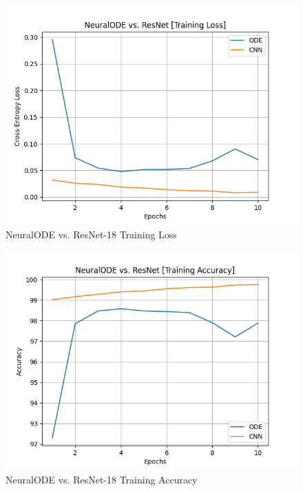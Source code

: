 \documentclass{article}
\begin{document}
\begin{figure}[H]
   \centering
   \includegraphics[width=\columnwidth]
   {./TrainingLoss.png}
   \caption{NeuralODE vs. ResNet-18 Training Loss}
   \label{fig:my_label}
\end{figure}

\begin{figure}[H]
   \centering
   \includegraphics[width=\columnwidth]
   {./TrainingAccuracy.png}
   \caption{NeuralODE vs. ResNet-18 Training Accuracy}
   \label{fig:my_label}
\end{figure}
\end{document}

